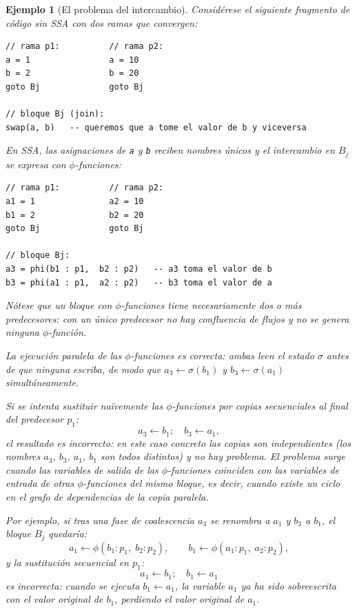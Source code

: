 \documentclass[12pt, a4paper]{article}
\newtheorem{example}{Ejemplo}[section]
\begin{document}
\begin{example}[El problema del intercambio]
\label{ex:swap}
Considérese el siguiente fragmento de código sin SSA con dos ramas que convergen:

\begin{verbatim}
// rama p1:          // rama p2:
a = 1                a = 10
b = 2                b = 20
goto Bj              goto Bj

// bloque Bj (join):
swap(a, b)   -- queremos que a tome el valor de b y viceversa
\end{verbatim}

En SSA, las asignaciones de \texttt{a} y \texttt{b} reciben nombres únicos
y el intercambio en $B_j$ se expresa con $\phi$-funciones:

\begin{verbatim}
// rama p1:          // rama p2:
a1 = 1               a2 = 10
b1 = 2               b2 = 20
goto Bj              goto Bj

// bloque Bj:
a3 = phi(b1 : p1,  b2 : p2)   -- a3 toma el valor de b
b3 = phi(a1 : p1,  a2 : p2)   -- b3 toma el valor de a
\end{verbatim}

Nótese que un bloque con $\phi$-funciones tiene necesariamente \emph{dos o más} predecesores:
con un único predecesor no hay confluencia de flujos y no se genera ninguna $\phi$-función.

La ejecución paralela de las $\phi$-funciones es correcta: ambas leen el estado
$\sigma$ \emph{antes} de que ninguna escriba, de modo que $a_3 \leftarrow \sigma(b_1)$
y $b_3 \leftarrow \sigma(a_1)$ simultáneamente.

Si se intenta sustituir naïvemente las $\phi$-funciones por copias secuenciales
al final del predecesor $p_1$:
\[
  a_3 \leftarrow b_1;\quad b_3 \leftarrow a_1,
\]
el resultado es incorrecto: en este caso concreto las copias son independientes
(los nombres $a_3$, $b_3$, $a_1$, $b_1$ son todos distintos) y no hay problema.
El problema surge cuando las variables de salida de las $\phi$-funciones coinciden
con las variables de entrada de otras $\phi$-funciones del mismo bloque, es decir,
cuando existe un \emph{ciclo} en el grafo de dependencias de la copia paralela.

Por ejemplo, si tras una fase de coalescencia $a_3$ se renombra a $a_1$ y $b_3$ a $b_1$,
el bloque $B_j$ quedaría:
\[
  a_1 \leftarrow \phi(b_1 : p_1,\; b_2 : p_2),\qquad
  b_1 \leftarrow \phi(a_1 : p_1,\; a_2 : p_2),
\]
y la sustitución secuencial en $p_1$:
\[
  a_1 \leftarrow b_1;\quad b_1 \leftarrow a_1
\]
es incorrecta: cuando se ejecuta $b_1 \leftarrow a_1$, la variable $a_1$ ya ha sido
sobreescrita con el valor original de $b_1$, perdiendo el valor original de $a_1$.
\end{example}
\end{document}

